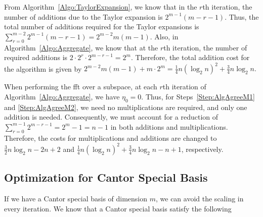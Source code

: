 From Algorithm~\ref{Algo:TaylorExpansion}, we know that in the $r$th iteration, the number of additions due to the Taylor expansion is $2^{m-1}(m-r-1)$. Thus, the total number of additions required for the Taylor expansions is $\sum_{r=0}^{m-2}2^{m-1}(m-r-1) = 2^{m-2}m(m-1)$. Also, in Algorithm~\ref{Algo:Aggregate}, we know that at the $r$th iteration, the number of required additions is $2 \cdot 2^r \cdot 2^{m-r-1} =2^{m}$. Therefore, the total addition cost for the algorithm is given by
\(2^{m-2}m(m-1) + m\cdot 2^m= \frac{1}{4}n(\log_2n)^2 + \frac{3}{4}n\log_2n. \)

When performing the \gls{fft} over a subspace, at each $r$th iteration of Algorithm~\ref{Algo:Aggregate}, we have $\eta_0=0$. Thus, for Steps~\ref{Step:AlgAgreeM1} and \ref{Step:AlgAgreeM2}, we need no multiplications are required, and only one addition is needed. Consequently, we must account for a reduction of $\sum_{r=0}^{m-1} 2^{m-r-1}=2^m-1=n-1$ in both additions and multiplications. Therefore, the costs for multiplications and additions are changed to
$\frac{3}{2} n \log_2 n -2n +2$ and  $\frac{1}{4}n(\log_2n)^2 + \frac{3}{4}n\log_2n-n+1$, respectively.

\subsection{Optimization for Cantor Special Basis}\label{Sec:Gao-optimization-Cantor_basis}

If we have a Cantor special basis of dimension $m$, we can avoid the scaling in every iteration. We know that a Cantor special basis satisfy the following

